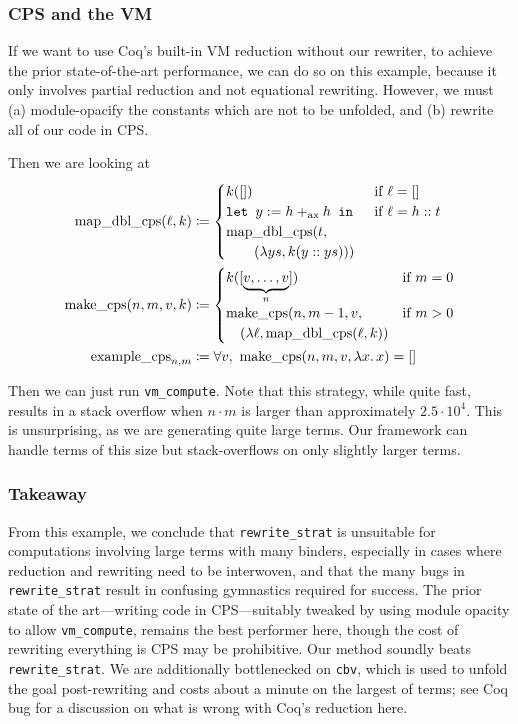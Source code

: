 \begin{subappendices}
\subsubsection{CPS and the VM}
If we want to use Coq's built-in VM reduction without our rewriter, to achieve the prior state-of-the-art performance, we can do so on this example, because it only involves partial reduction and not equational rewriting.
However, we must (a) module-opacify the constants which are not to be unfolded, and (b) rewrite all of our code in CPS.

Then we are looking at
\begin{align*}
    \text{map\_dbl\_cps}(\ell,k) & \defeq \begin{cases} k([]) & \text{if }\ell = [] \\
        \letin[{y := h +_\text{ax} h}{}] & \text{if }\ell = h::t \\
        \text{map\_dbl\_cps}(t, \\
        \qquad(\lambda ys, k(y :: ys)))
    \end{cases} \\
    \text{make\_cps}(n, m, v, k) & \defeq \begin{cases} k([\underbrace{v, \ldots, v}_n]) & \text{if }m = 0 \\
        \text{make\_cps}(n, m-1, v, & \text{if }m > 0 \\
        \quad(\lambda \ell,\text{map\_dbl\_cps}(\ell, k))
    \end{cases} \\
    \text{example\_cps}_{n, m} & \defeq \forall v,\ \text{make\_cps}(n, m, v, \lambda x.\,x) = []
\end{align*}

Then we can just run \texttt{vm\_compute}.
Note that this strategy, while quite fast, results in a stack overflow when $n \cdot m$ is larger than approximately $2.5\cdot 10^4$.
This is unsurprising, as we are generating quite large terms.
Our framework can handle terms of this size but stack-overflows on only slightly larger terms.

\subsubsection{Takeaway}

From this example, we conclude that \texttt{rewrite\_strat} is unsuitable for computations involving large terms with many binders, especially in cases where reduction and rewriting need to be interwoven, and that the many bugs in \texttt{rewrite\_strat} result in confusing gymnastics required for success.
The prior state of the art---writing code in CPS---suitably tweaked by using module opacity to allow \texttt{vm\_compute}, remains the best performer here, though the cost of rewriting everything is CPS may be prohibitive.
Our method soundly beats \texttt{rewrite\_strat}.
We are additionally bottlenecked on \texttt{cbv}, which is used to unfold the goal post-rewriting and costs about a minute on the largest of terms; see Coq bug  for a discussion on what is wrong with Coq's reduction here.


\end{subappendices}
